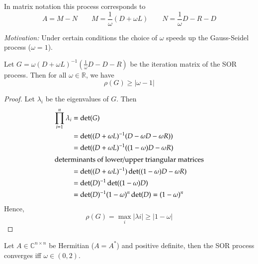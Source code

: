 \documentclass[a4paper]{article}
\numberwithin{lecref}{section}
\theoremstyle{break}
\newcommand{\Abs}[1]{\left|#1\right|}
\begin{document}
In matrix notation this process corresponds to
\[ A = M - N \qquad M = \frac{1}{\omega} (D + \omega L) \qquad N = \frac{1}{\omega} D - R - D \]

\emph{Motivation:}
Under certain conditions the choice of $\omega$ speeds up the Gauss-Seidel process ($\omega = 1$).

\begin{theorem}
  \label{theorem:7-8}
  Let $G = \omega(D + \omega L)^{-1} \left(\frac1\omega D - D - R\right)$ be the iteration matrix of the SOR process.
  Then for all $\omega \in \mathbb R$, we have
  \[ \rho(G) \geq \Abs{\omega - 1} \]
\end{theorem}

\begin{proof}
  Let $\lambda_i$ be the eigenvalues of $G$. Then
  \begin{align*}
    \prod_{i=1}^n \lambda_i &= \det(G) \\
        &= \det((D + \omega L)^{-1} (D - \omega D - \omega R)) \\
        &= \det((D + \omega L)^{-1} ((1 - \omega) D - \omega R) \\
  \intertext{determinants of lower/upper triangular matrices}
        &= \det((D + \omega L)^{-1}) \det((1 - \omega) D - \omega R) \\
        &= \det(D)^{-1} \det((1 - \omega) D) \\
        &= \det(D)^{-1} (1 - \omega)^n \det(D) = (1 - \omega)^n
  \end{align*}
  Hence,
  \[ \rho(G) = \max_i \Abs{\lambda i} \geq \Abs{1 - \omega} \]
\end{proof}

\begin{theorem}
  \label{theorem:7-9}
  Let $A \in \mathbb C^{n \times n}$ be Hermitian ($A = A^*$) and positive definite,
  then the SOR process converges iff $\omega \in (0, 2)$.
\end{theorem}
\end{document}

